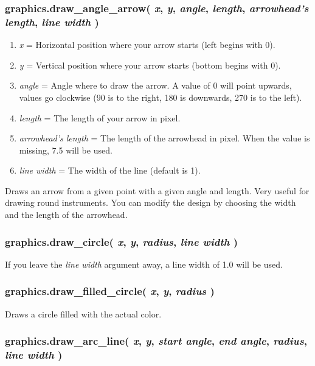 \documentclass[11pt,parskip=half,a4paper]{scrartcl}
\begin{document}
\subsubsection{graphics.draw\_angle\_arrow( \emph{x}, \emph{y}, \emph{angle}, \emph{length}, \emph{arrowhead's length}, \emph{line width} )}

\begin{enumerate}
	\item \emph{x} = Horizontal position where your arrow starts (left begins with 0).
	\item \emph{y} = Vertical position where your arrow starts (bottom begins with 0).
	\item \emph{angle} = Angle where to draw the arrow. A value of 0 will point upwards, values go clockwise (90 is to the right, 180 is downwards, 270 is to the left).
	\item \emph{length} = The length of your arrow in pixel.
	\item \emph{arrowhead's length} = The length of the arrowhead in pixel. When the value is missing, 7.5 will be used.
	\item \emph{line width} = The width of the line (default is 1).
\end{enumerate}

Draws an arrow from a given point with a given angle and length. Very useful for drawing round instruments. You can modify the design by choosing the width and the length of the arrowhead.

\subsubsection{graphics.draw\_circle( \emph{x}, \emph{y}, \emph{radius}, \emph{line width} )}

If you leave the \emph{line width} argument away, a line width of 1.0 will be used.

\subsubsection{graphics.draw\_filled\_circle( \emph{x}, \emph{y}, \emph{radius} )}

Draws a circle filled with the actual color.

\subsubsection{graphics.draw\_arc\_line( \emph{x}, \emph{y}, \emph{start angle}, \emph{end angle}, \emph{radius}, \emph{line width} )}
\end{document}
